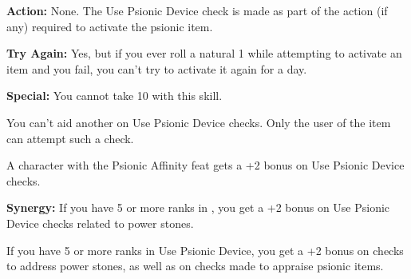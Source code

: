 \textbf{Action:} None. The Use Psionic Device check is made as part of the action (if any) required to activate the psionic item.

\textbf{Try Again:} Yes, but if you ever roll a natural 1 while attempting to activate an item and you fail, you can't try to activate it again for a day.

\textbf{Special:} You cannot take 10 with this skill.

You can't aid another on Use Psionic Device checks. Only the user of the item can attempt such a check.

A character with the Psionic Affinity feat gets a +2 bonus on Use Psionic Device checks.

\textbf{Synergy:} If you have 5 or more ranks in , you get a +2 bonus on Use Psionic Device checks related to power stones.

If you have 5 or more ranks in Use Psionic Device, you get a +2 bonus on  checks to address power stones, as well as on  checks made to appraise psionic items.
